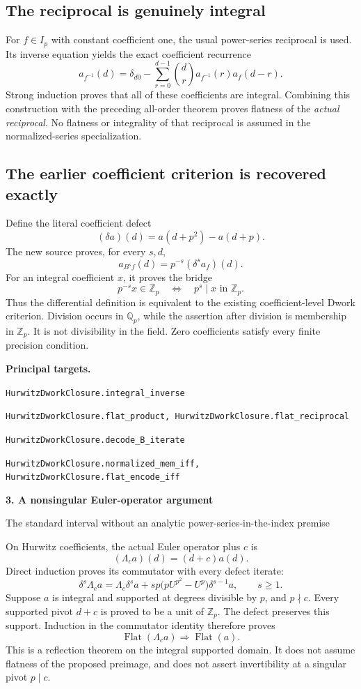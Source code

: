 \documentclass[11pt]{article}
\newcommand{\Z}{\mathbb Z}\newcommand{\N}{\mathbb N}\newcommand{\Q}{\mathbb Q}
\newcommand{\target}[1]{{\footnotesize\texttt{#1}}}
\newcommand{\pageheading}[2]{{\Large\bfseries\color{ink}#1}\par{\small #2}\par\medskip}
\begin{document}
\subsection*{The reciprocal is genuinely integral}
For $f\in I_p$ with constant coefficient one, the usual power-series reciprocal is used. Its inverse equation yields the exact coefficient recurrence
\[
 a_{f^{-1}}(d)=\delta_{d0}-\sum_{r=0}^{d-1}
     \binom dr a_{f^{-1}}(r)a_f(d-r).
\]
Strong induction proves that all of these coefficients are integral. Combining this construction with the preceding all-order theorem proves flatness of the \emph{actual reciprocal}. No flatness or integrality of that reciprocal is assumed in the normalized-series specialization.

\subsection*{The earlier coefficient criterion is recovered exactly}
Define the literal coefficient defect
\[
 (\delta a)(d)=a(d+p^2)-a(d+p).
\]
The new source proves, for every $s,d$,
\[
 a_{B^s f}(d)=p^{-s}(\delta^s a_f)(d).
\]
For an integral coefficient $x$, it proves the bridge
\[
\boxed{p^{-s}x\in\Z_p\quad\Longleftrightarrow\quad p^s\mid x\text{ in }\Z_p.}
\]
Thus the differential definition is equivalent to the existing coefficient-level Dwork criterion. Division occurs in $\Q_p$, while the assertion after division is membership in $\Z_p$. It is not divisibility in the field. Zero coefficients satisfy every finite precision condition.

\textbf{Principal targets.}\par
\target{HurwitzDworkClosure.integral\_inverse}\par
\target{HurwitzDworkClosure.flat\_product, HurwitzDworkClosure.flat\_reciprocal}\par
\target{HurwitzDworkClosure.decode\_B\_iterate}\par
\target{HurwitzDworkClosure.normalized\_mem\_iff, HurwitzDworkClosure.flat\_encode\_iff}

\newpage
\pageheading{3. A nonsingular Euler-operator argument}{The standard interval without an analytic power-series-in-the-index premise}
On Hurwitz coefficients, the actual Euler operator plus $c$ is
\[
 (\Lambda_c a)(d)=(d+c)a(d).
\]
Direct induction proves its commutator with every defect iterate:
\[
 \delta^s\Lambda_c a
 =\Lambda_c\delta^s a
  +sp\bigl(pU^{p^2}-U^p\bigr)\delta^{s-1}a,
 \qquad s\ge1.
\]
Suppose $a$ is integral and supported at degrees divisible by $p$, and $p\nmid c$. Every supported pivot $d+c$ is proved to be a unit of $\Z_p$. The defect preserves this support. Induction in the commutator identity therefore proves
\[
 \operatorname{Flat}(\Lambda_c a)\Longrightarrow\operatorname{Flat}(a).
\]
This is a reflection theorem on the integral supported domain. It does not assume flatness of the proposed preimage, and does not assert invertibility at a singular pivot $p\mid c$.
\end{document}
